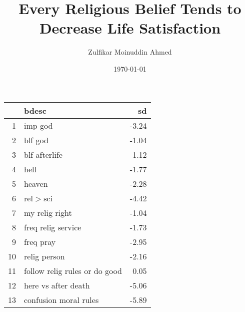 \documentclass{amsart}
\title{Every Religious Belief Tends to Decrease Life Satisfaction}
\author{Zulfikar Moinuddin Ahmed}
\date{\today}
\begin{document}
\maketitle

\begin{table}[ht]
\centering
\begin{tabular}{rlr}
  \hline
 & bdesc & sd \\ 
  \hline
1 & imp god & -3.24 \\ 
  2 & blf god & -1.04 \\ 
  3 & blf afterlife & -1.12 \\ 
  4 & hell & -1.77 \\ 
  5 & heaven & -2.28 \\ 
  6 & rel$>$sci & -4.42 \\ 
  7 & my relig right & -1.04 \\ 
  8 & freq relig service & -1.73 \\ 
  9 & freq pray & -2.95 \\ 
  10 & relig person & -2.16 \\ 
  11 & follow relig rules or do good & 0.05 \\ 
  12 & here vs after death & -5.06 \\ 
  13 & confusion moral rules & -5.89 \\ 
   \hline
\end{tabular}
\end{table}
\end{document}
